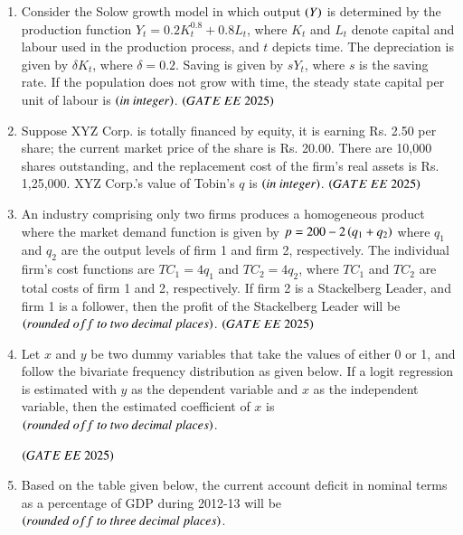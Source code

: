 \documentclass[journal,12pt,onecolumn]{IEEEtran}
\theoremstyle{remark}
\begin{document}
\begin{enumerate}
\item Consider the Solow growth model in which output $\left(Y\right)$ is determined by the production function $Y_t = 0.2 K_t^{0.8} + 0.8 L_t$, where $K_t$ and $L_t$ denote capital and labour used in the production process, and $t$ depicts time. The depreciation is given by $\delta K_t$, where $\delta = 0.2$. Saving is given by $sY_t$, where $s$ is the saving rate. If the population does not grow with time, the steady state capital per unit of labour is \underline{\hspace{2cm}} $\left(in\ integer\right)$. 
\hfill $\brak{GATE\ EE\ 2025}$
\item Suppose XYZ Corp. is totally financed by equity, it is earning Rs. 2.50 per share; the current market price of the share is Rs. 20.00. There are 10,000 shares outstanding, and the replacement cost of the firm's real assets is Rs. 1,25,000. XYZ Corp.'s value of Tobin's $q$ is \underline{\hspace{2cm}} $\left(in\ integer\right)$. 
 \hfill $\brak{GATE\ EE\ 2025}$
\item An industry comprising only two firms produces a homogeneous product where the market demand function is given by $p = 200 - 2\left(q_1 + q_2\right)$ where $q_1$ and $q_2$ are the output levels of firm 1 and firm 2, respectively. The individual firm's cost functions are $TC_1 = 4q_1$ and $TC_2 = 4q_2$, where $TC_1$ and $TC_2$ are total costs of firm 1 and 2, respectively. If firm 2 is a Stackelberg Leader, and firm 1 is a follower, then the profit of the Stackelberg Leader will be \underline{\hspace{2cm}} $\brak{rounded\ off\ to\ two\ decimal\ places}$. 
 \hfill $\brak{GATE\ EE\ 2025}$
\item Let $x$ and $y$ be two dummy variables that take the values of either 0 or 1, and follow the bivariate frequency distribution as given below. If a logit regression is estimated with $y$ as the dependent variable and $x$ as the independent variable, then the estimated coefficient of $x$ is \underline{\hspace{2cm}} $\brak{rounded\ off\ to\ two\ decimal\ places}$.
\begin{center}

\end{center}
 \hfill $\brak{GATE\ EE\ 2025}$
\item Based on the table given below, the current account deficit in nominal terms as a percentage of GDP during 2012-13 will be \underline{\hspace{2cm}} $\brak{rounded\ off\ to\ three\ decimal\ places}$.\\

\end{enumerate}
\end{document}
